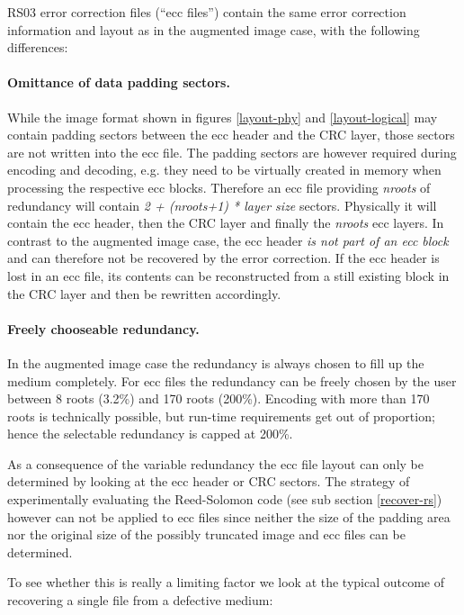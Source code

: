 \medskip

RS03 error correction files (``ecc files'')
contain the same error correction information
and layout as in the augmented image case, with the following differences:

\paragraph{Omittance of data padding sectors.} While the image format
shown in figures \ref{layout-phy} and \ref{layout-logical}
 may contain padding sectors between the ecc header and the CRC layer,
those sectors are not written into the ecc file.
The padding sectors are however required during encoding and
decoding, e.g. they need to be virtually created in memory 
when processing the respective ecc blocks. 
Therefore an ecc file providing {\em nroots} of redundancy
will contain {\em 2 + (nroots+1) * layer size} sectors.
Physically it will contain the ecc header, then the CRC layer 
and finally the {\em nroots} ecc layers. In contrast to the
augmented image case, the ecc header {\em is not part of an ecc
  block} and can therefore not be recovered
by the error correction. If the ecc header is lost in an ecc file,
its contents can be reconstructed from a still existing block
in the CRC layer and then be rewritten accordingly.

\paragraph{Freely chooseable redundancy.} In the augmented image case
the redundancy is always chosen to fill up the medium completely.
For ecc files the redundancy can be freely chosen by the user between
 8 roots (3.2\%) and 170 roots (200\%). Encoding with more than 170 roots
is technically possible, but run-time requirements get out of proportion;
hence the selectable redundancy is capped at 200\%.

\medskip

As a consequence of the variable redundancy the ecc file layout can only
be determined by looking at the ecc header or CRC sectors. The strategy
of experimentally evaluating the Reed-Solomon code (see sub 
section \ref{recover-rs}) however can not be applied to ecc files since
neither the size of the padding area nor the original size of the 
possibly truncated image and ecc files can be determined. \medskip

To see whether this is really a limiting factor we look
at the typical outcome of recovering a single file from a defective
medium:

